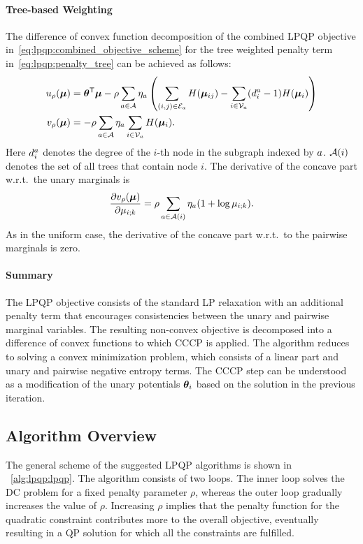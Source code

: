 \paragraph{Tree-based Weighting}
The difference of convex function decomposition of the combined \ac{LPQP}
objective in~\eqref{eq:lpqp:combined_objective_scheme} for the tree weighted penalty term
in~\eqref{eq:lpqp:penalty_tree} can be achieved as follows:
\begin{align*}
    u_{\rho}(\bm{\mu}) & = \bm{\theta}^{\mathsf{T}}\bm{\mu} - \rho
    \sum_{a \in \mathcal{A}} \eta_{a} \left (
    \sum_{(i,j) \in \mathcal{E}_a}H(\bm{\mu}_{ij}) - \sum_{i
    \in \mathcal{V}_a} (d_i^a-1)H(\bm{\mu}_{i})\right)\\
    v_{\rho}(\bm{\mu}) & = -\rho \sum_{a
    \in \mathcal{A}} \eta_{a}\sum_{i \in \mathcal{V}_{a}}
    H(\bm{\mu}_i).
\end{align*}
Here 
$d_i^a$ denotes the degree of the $i$-th node in the subgraph indexed by $a$.
$\mathcal{A}(i)$ denotes the set of all trees that contain node $i$. The derivative
of the concave part w.r.t.\ the unary marginals is
\[
    \frac{\partial
    v_{\rho}(\bm{\mu})}{\partial \mu_{i;k}} = \rho \sum_{a \in
    \mathcal{A}(i)} \eta_{a} (1+\log\mu_{i;k}).
\]
As in the uniform case, the derivative of the concave part w.r.t.\ to the
pairwise marginals is zero.

\paragraph{Summary}
The \ac{LPQP} objective consists of the standard \ac{LP} relaxation with an
additional penalty term that encourages consistencies between the unary
and pairwise marginal variables. The resulting non-convex objective is
decomposed into a difference of convex functions to which \ac{CCCP} is
applied. The
algorithm reduces to solving a convex minimization problem, which consists of
a linear part and unary and pairwise negative entropy terms. The
\ac{CCCP} step can be understood as a modification of the unary
potentials $\bm{\theta}_i$ based on the solution in the
previous iteration.

\subsection{Algorithm Overview}
\label{sec:lpqp:algorithm_overview}

The general scheme of the suggested \ac{LPQP} algorithms is shown in
~\autoref{alg:lpqp:lpqp}. 
The algorithm consists of two loops. The inner loop solves the \ac{DC} problem for a fixed penalty 
parameter $\rho$, whereas the outer loop gradually increases the value of
$\rho$. Increasing $\rho$ implies that the penalty function for the quadratic
constraint contributes more to the overall objective, eventually resulting in a
\ac{QP} solution for which all the constraints are fulfilled.

